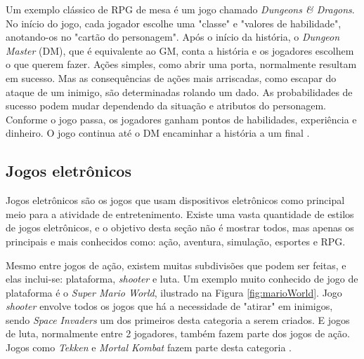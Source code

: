\documentclass[
	12pt,					%
	openright,				%
	oneside,				%
	a4paper,				%
	bibjustif,				%
	chapter=TITLE,			%
	english,				%
	brazil,					%
	]{abntex2}
\begin{document}
		Um exemplo clássico de RPG de mesa é um jogo chamado \textit{Dungeons \& Dragons}.
		No início do jogo,
		cada jogador escolhe uma "classe"{} e "valores de habilidade",
		anotando-os no "cartão do personagem"{}.
		Após o início da história,
		o \textit{Dungeon Master} (DM), que é equivalente ao GM, conta a história
		e os jogadores escolhem o que querem fazer.
		Ações simples, como abrir uma porta, normalmente resultam em sucesso.
		Mas as consequências de ações mais arriscadas,
		como escapar do ataque de um inimigo,
		são determinadas rolando um dado.
		As probabilidades de sucesso podem mudar dependendo da situação e atributos do personagem.
		Conforme o jogo passa,
		os jogadores ganham pontos de habilidades, experiência e dinheiro.
		O jogo continua até o DM encaminhar a história a um final \cite{dungeonsDragons}.
			
	
		\FloatBarrier
		\subsection{Jogos eletrônicos}
		Jogos eletrônicos são os jogos que usam dispositivos eletrônicos como principal meio para a atividade de entretenimento.
		Existe uma vasta quantidade de estilos de jogos eletrônicos,
		e o objetivo desta seção não é mostrar todos,
		mas apenas os principais e mais conhecidos como:
		ação, aventura, simulação, esportes e RPG.
		
		Mesmo entre jogos de ação,
		existem muitas subdivisões que podem ser feitas,
		e elas inclui-se: plataforma, \textit{shooter} e luta.
		Um exemplo muito conhecido de jogo de plataforma é o \textit{Super Mario World},
		ilustrado na Figura \ref{fig:marioWorld}.
		Jogo \textit{shooter} envolve todos os jogos que há a necessidade de "atirar"{} em inimigos,
		sendo \textit{Space Invaders} um dos primeiros desta categoria a serem criados.
		E jogos de luta, normalmente entre 2 jogadores,
		também fazem parte dos jogos de ação.
		Jogos como \textit{Tekken} e \textit{Mortal Kombat} fazem parte desta categoria \cite{gameGenres}.
		
\end{document}
